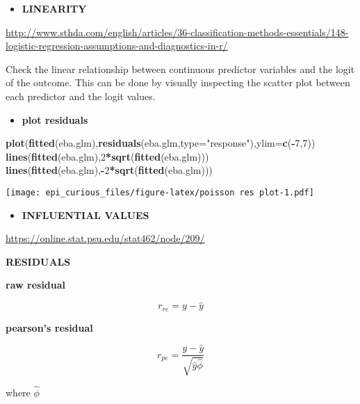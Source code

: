 \documentclass[
]{article}
\newenvironment{Shaded}{\begin{snugshade}}{\end{snugshade}}
\newcommand{\DataTypeTok}[1]{\textcolor[rgb]{0.13,0.29,0.53}{#1}}
\newcommand{\DecValTok}[1]{\textcolor[rgb]{0.00,0.00,0.81}{#1}}
\newcommand{\KeywordTok}[1]{\textcolor[rgb]{0.13,0.29,0.53}{\textbf{#1}}}
\newcommand{\NormalTok}[1]{#1}
\newcommand{\OperatorTok}[1]{\textcolor[rgb]{0.81,0.36,0.00}{\textbf{#1}}}
\newcommand{\StringTok}[1]{\textcolor[rgb]{0.31,0.60,0.02}{#1}}
\providecommand{\tightlist}{%
  \setlength{\itemsep}{0pt}\setlength{\parskip}{0pt}}
\begin{document}
\begin{itemize}
\tightlist
\item
  \textbf{LINEARITY}
\end{itemize}

\url{http://www.sthda.com/english/articles/36-classification-methods-essentials/148-logistic-regression-assumptions-and-diagnostics-in-r/}

Check the linear relationship between continuous predictor variables and
the logit of the outcome. This can be done by visually inspecting the
scatter plot between each predictor and the logit values.

\begin{itemize}
\tightlist
\item
  \textbf{plot residuals}
\end{itemize}

\begin{Shaded}
\begin{Highlighting}[]
\KeywordTok{plot}\NormalTok{(}\KeywordTok{fitted}\NormalTok{(eba.glm),}\KeywordTok{residuals}\NormalTok{(eba.glm,}\DataTypeTok{type=}\StringTok{"response"}\NormalTok{),}\DataTypeTok{ylim=}\KeywordTok{c}\NormalTok{(}\OperatorTok{-}\DecValTok{7}\NormalTok{,}\DecValTok{7}\NormalTok{)) }
\KeywordTok{lines}\NormalTok{(}\KeywordTok{fitted}\NormalTok{(eba.glm),}\DecValTok{2}\OperatorTok{*}\KeywordTok{sqrt}\NormalTok{(}\KeywordTok{fitted}\NormalTok{(eba.glm))) }
\KeywordTok{lines}\NormalTok{(}\KeywordTok{fitted}\NormalTok{(eba.glm),}\OperatorTok{-}\DecValTok{2}\OperatorTok{*}\KeywordTok{sqrt}\NormalTok{(}\KeywordTok{fitted}\NormalTok{(eba.glm)))}
\end{Highlighting}
\end{Shaded}

\texttt{[image: epi\_curious\_files/figure-latex/poisson res plot-1.pdf]}

\begin{itemize}
\tightlist
\item
  \textbf{INFLUENTIAL VALUES}
\end{itemize}

\url{https://online.stat.psu.edu/stat462/node/209/}

\textbf{RESIDUALS}

\textbf{raw residual}

\[r_{re}= y- \hat{y}\]

\textbf{pearson's residual}

\[r_{pe}=\frac{y-\hat{y}}{\sqrt{\hat{y}\hat{\phi}}}\]

where \(\hat{\phi}\)
\end{document}
